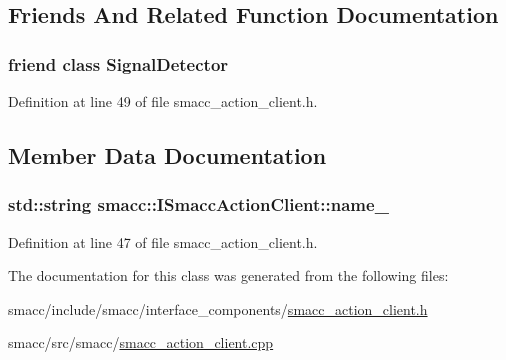 \subsection{Friends And Related Function Documentation}
\subsubsection[{\texorpdfstring{Signal\+Detector}{SignalDetector}}]{\setlength{\rightskip}{0pt plus 5cm}friend class {\bf Signal\+Detector}\hspace{0.3cm}{\ttfamily [friend]}}\hypertarget{classsmacc_1_1ISmaccActionClient_a9fb9044f83e768849d1b42d9d0d5508e}{}\label{classsmacc_1_1ISmaccActionClient_a9fb9044f83e768849d1b42d9d0d5508e}


Definition at line 49 of file smacc\+\_\+action\+\_\+client.\+h.



\subsection{Member Data Documentation}
\subsubsection[{\texorpdfstring{name\+\_\+}{name_}}]{\setlength{\rightskip}{0pt plus 5cm}std\+::string smacc\+::\+I\+Smacc\+Action\+Client\+::name\+\_\+\hspace{0.3cm}{\ttfamily [protected]}}\hypertarget{classsmacc_1_1ISmaccActionClient_aec84a0169bf40d394207540ad75b364e}{}\label{classsmacc_1_1ISmaccActionClient_aec84a0169bf40d394207540ad75b364e}


Definition at line 47 of file smacc\+\_\+action\+\_\+client.\+h.



The documentation for this class was generated from the following files\+:\begin{DoxyCompactItemize}
\item 
smacc/include/smacc/interface\+\_\+components/\hyperlink{smacc__action__client_8h}{smacc\+\_\+action\+\_\+client.\+h}\item 
smacc/src/smacc/\hyperlink{smacc__action__client_8cpp}{smacc\+\_\+action\+\_\+client.\+cpp}\end{DoxyCompactItemize}
